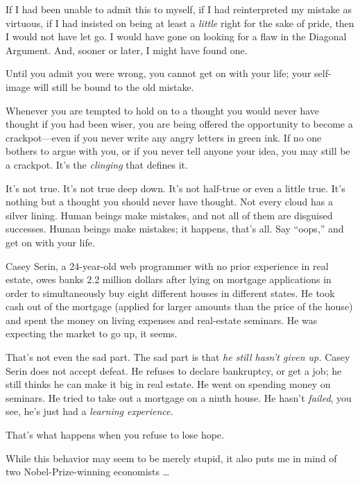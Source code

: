 {
 If I had been unable to admit this to myself, if I had
reinterpreted my mistake as virtuous, if I had insisted on being at
least a \textit{little} right for the sake of pride, then I would not
have let go. I would have gone on looking for a flaw in the Diagonal
Argument. And, sooner or later, I might have found one.}

{
 Until you admit you were wrong, you cannot get on with your life;
your self-image will still be bound to the old mistake.}

{
 Whenever you are tempted to hold on to a thought you would never
have thought if you had been wiser, you are being offered the
opportunity to become a crackpot---even if you never write any angry
letters in green ink. If no one bothers to argue with you, or if you
never tell anyone your idea, you may still be a crackpot.
It's the \textit{clinging} that defines it.}

{
 It's not true. It's not true deep
down. It's not half-true or even a little true.
It's nothing but a thought you should never have
thought. Not every cloud has a silver lining. Human beings make
mistakes, and not all of them are disguised successes. Human beings
make mistakes; it happens, that's all. Say
``oops,'' and get on with your
life.}

\myendsectiontext


{
 Casey Serin, a 24-year-old web programmer with no prior experience
in real estate, owes banks 2.2 million dollars after lying on mortgage
applications in order to simultaneously buy eight different houses in
different states. He took cash out of the mortgage (applied for larger
amounts than the price of the house) and spent the money on living
expenses and real-estate seminars. He was expecting the market to go
up, it seems. }

{
 That's not even the sad part. The sad part is that
\textit{he still hasn't given up.} Casey Serin does not
accept defeat. He refuses to declare bankruptcy, or get a job; he still
thinks he can make it big in real estate. He went on spending money on
seminars. He tried to take out a mortgage on a ninth house. He
hasn't \textit{failed}, you see, he's
just had a \textit{learning experience.}}

{
 That's what happens when you refuse to lose hope.}

{
 While this behavior may seem to be merely stupid, it also puts me
in mind of two Nobel-Prize-winning economists \ldots}

